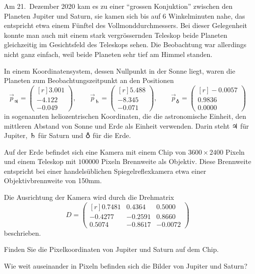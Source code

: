 Am 21.~Dezember 2020 kam es zu einer ``grossen Konjuktion'' zwischen den
Planeten Jupiter und Saturn, sie kamen sich bis auf 6 Winkelminuten
nahe, das entspricht etwa einem Fünftel des Vollmonddurchmessers.
Bei dieser Gelegenheit konnte man auch mit einem stark vergrössernden
Teleskop beide Planeten gleichzeitig im Gesichtsfeld des Teleskops sehen.
Die Beobachtung war allerdings nicht ganz einfach, weil beide Planeten sehr
tief am Himmel standen.

In einem Koordinatensystem, dessen Nullpunkt in der Sonne liegt, 
waren die Planeten zum Beobachtungszeitpunkt an den Positionen
\[
\vec{p}_{\jupiter}
=
\begin{pmatrix*}[r]
   3.001\\
  -4.122\\
  -0.049
\end{pmatrix*}
,\qquad
\vec{p}_{\saturn}
=
\begin{pmatrix*}[r]
   5.488\\
  -8.345\\
  -0.071
\end{pmatrix*}
,\qquad
\vec{p}_{\earth}
=
\begin{pmatrix*}[r]
  -0.0057\\
   0.9836\\
   0.0000
\end{pmatrix*}
\]
in sogenannten heliozentrischen Koordinaten, die die astronomische Einheit,
den mittleren Abstand von Sonne und Erde als Einheit verwenden.
Darin steht $\jupiter$ für Jupiter, $\saturn$ für Saturn und $\earth$ für
die Erde.

Auf der Erde befindet sich eine Kamera mit einem Chip von $3600\times 2400$
Pixeln und einem Teleskop mit $100000$ Pixeln Brennweite als Objektiv.
Diese Brennweite entspricht bei einer handelsüblichen Spiegelreflexkamera
etwa einer Objektivbrennweite von 150mm.

Die Ausrichtung  der Kamera wird durch die Drehmatrix
\[
D=\begin{pmatrix*}[r]
   0.7481&  0.4364&  0.5000\\
  -0.4277& -0.2591&  0.8660\\
   0.5074& -0.8617& -0.0072
\end{pmatrix*}
\]
beschrieben.
\begin{teilaufgaben}
\item
Finden Sie die Pixelkoordinaten von Jupiter und Saturn auf dem Chip.
\item
Wie weit auseinander in Pixeln befinden sich die Bilder von Jupiter und
Saturn?
\end{teilaufgaben}

